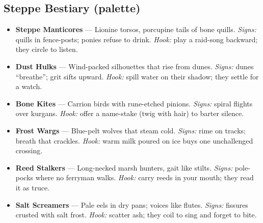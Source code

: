 \subsection*{Steppe Bestiary (palette)}
\begin{itemize}
  \item \textbf{Steppe Manticores} — Lionine torsos, porcupine tails of bone quills. \emph{Signs:} quills in fence-posts; ponies refuse to drink. \emph{Hook:} play a raid-song backward; they circle to listen.
  \item \textbf{Dust Hulks} — Wind-packed silhouettes that rise from dunes. \emph{Signs:} dunes “breathe”; grit sifts upward. \emph{Hook:} spill water on their shadow; they settle for a watch.
  \item \textbf{Bone Kites} — Carrion birds with rune-etched pinions. \emph{Signs:} spiral flights over kurgans. \emph{Hook:} offer a name-stake (twig with hair) to barter silence.
  \item \textbf{Frost Wargs} — Blue-pelt wolves that steam cold. \emph{Signs:} rime on tracks; breath that crackles. \emph{Hook:} warm milk poured on ice buys one unchallenged crossing.
  \item \textbf{Reed Stalkers} — Long-necked marsh hunters, gait like stilts. \emph{Signs:} pole-pocks where no ferryman walks. \emph{Hook:} carry reeds in your mouth; they read it as truce.
  \item \textbf{Salt Screamers} — Pale eels in dry pans; voices like flutes. \emph{Signs:} fissures crusted with salt frost. \emph{Hook:} scatter ash; they coil to sing and forget to bite.
\end{itemize}

